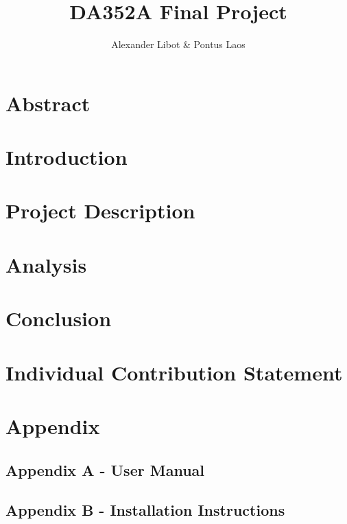 \documentclass[conference]{IEEEtran}
\title{DA352A Final Project}
\author{Alexander Libot \& Pontus Laos}
\begin{document}
\maketitle
\newpage
{}


\section{Abstract}
\label{abstract}


\section{Introduction}
\label{intro}


\section{Project Description}
\label{project-description}


\section{Analysis}
\label{analysis}


\section{Conclusion}
\label{conclusion}


\section{Individual Contribution Statement}
\label{ics}


\section{Appendix}
\label{appendix}


\subsection{Appendix A - User Manual}
\label{user-manual}


\subsection{Appendix B - Installation Instructions}
\label{installation-instructions}

\end{document}
